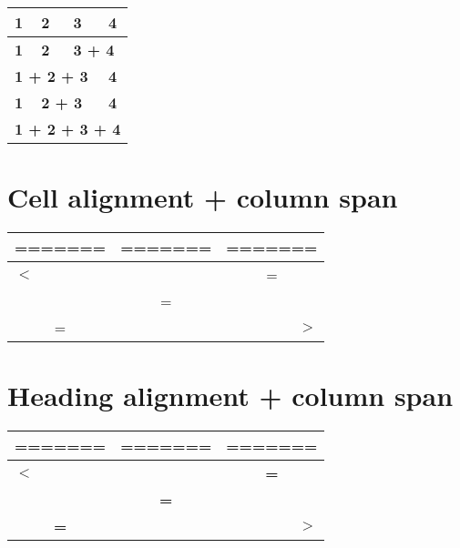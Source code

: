 \documentclass{article}
\begin{document}
\begin{center}\begin{tabular}{|l|l|l|l|}
\hline \textbf{1} & \textbf{2} & \textbf{3} & \textbf{4} \\
\hline \textbf{1} & \textbf{2} & \multicolumn{2}{|l|}{\textbf{3 + 4}} \\
\hline \multicolumn{3}{|l|}{\textbf{1 + 2 + 3}} & \textbf{4} \\
\hline \textbf{1} & \multicolumn{2}{|l|}{\textbf{2 + 3}} & \textbf{4} \\
\hline \multicolumn{4}{|l|}{\textbf{1 + 2 + 3 + 4}} \\
\hline \end{tabular}\end{center}

\section*{Cell alignment + column span}

\begin{center}\begin{tabular}{|l|l|l|}
\hline ======= & ======= & ======= \\
\hline \multicolumn{2}{|l|}{$<$} & \multicolumn{1}{|c|}{=} \\
\hline \multicolumn{3}{|c|}{=} \\
\hline \multicolumn{1}{|c|}{=} & \multicolumn{2}{|r|}{$>$} \\
\hline \end{tabular}\end{center}

\section*{Heading alignment + column span}

\begin{center}\begin{tabular}{|l|l|l|}
\hline \textbf{=======} & \textbf{=======} & \textbf{=======} \\
\hline \multicolumn{2}{|l|}{\textbf{$<$}} & \multicolumn{1}{|c|}{\textbf{=}} \\
\hline \multicolumn{3}{|c|}{\textbf{=}} \\
\hline \multicolumn{1}{|c|}{\textbf{=}} & \multicolumn{2}{|r|}{\textbf{$>$}} \\
\hline \end{tabular}\end{center}
\end{document}
